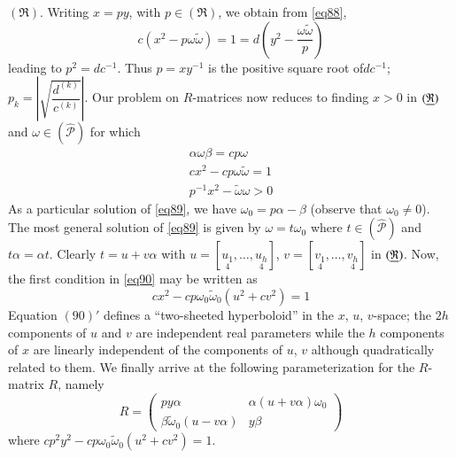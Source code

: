 $(\mathfrak{R})$. Writing $x=py$, with $p\in(\mathfrak{R})$, we obtain
from \eqref{eq88},
$$
c(x^{2}-p\omega\widetilde{\omega})=1=d\left(y^{2}-\dfrac{\omega\widetilde{\omega}}{p}\right)
$$
leading to $p^{2}=dc^{-1}$. Thus $p=xy^{-1}$ is the positive square
root of\pageoriginale $dc^{-1}$; \ie
$p_{k}=\left|\sqrt{\dfrac{d^{(k)}}{c^{(k)}}}\right|$. Our problem on
$R$-matrices now reduces to finding $x>0$ in $(\underline{\mathfrak{R}})$ and
$\omega\in(\widehat{\mathscr{P}})$ for which
\begin{gather*}
\alpha\omega\beta=cp\omega\tag{89}\label{eq89}\\
cx^{2}-cp\omega\widetilde{\omega}=1\tag{90}\label{eq90}\\
p^{-1}x^{2}-\widetilde{\omega}\omega>0
\end{gather*}
As a particular solution of \eqref{eq89}, we have
$\omega_{0}=p\alpha-\beta$ (observe that $\omega_{0}\neq 0$). The most
general solution of \eqref{eq89} is given by $\omega=t\omega_{0}$ where
$t\in(\widehat{\mathscr{P}})$ and $t\alpha=\alpha t$. Clearly
$t=u+v\alpha$ with
$u=[\underset{4}{u_{1}},\ldots,\underset{4}{u_{h}}]$,
$v=[\underset{4}{v_{1}},\ldots,\underset{4}{v_{h}}]$ in
$(\underline{\mathfrak{R}})$. Now, the first condition in \eqref{eq90} may be
written as
\begin{equation*}
cx^{2}-cp\omega_{0}\widetilde{\omega}_{0}(u^{2}+cv^{2})=1\tag*{$(90)'$}
\end{equation*}
Equation $(90)'$ defines a ``two-sheeted hyperboloid'' in the $x$,
$u$, $v$-space; the $2h$ components of $u$ and $v$ are independent
real parameters while the $h$ components of $x$ are linearly
independent of the components of $u$, $v$ although quadratically
related to them. We finally arrive at the following parameterization
for the $R$-matrix $R$, namely
\begin{equation*}
R=
\begin{pmatrix}
py\alpha & \alpha(u+v\alpha)\omega_{0}\\
\beta\widetilde{\omega}_{0}(u-v\alpha) & y\beta
\end{pmatrix}\tag{91}\label{eq91}
\end{equation*}
where
$cp^{2}y^{2}-cp\omega_{0}\widetilde{\omega}_{0}(u^{2}+cv^{2})=1$.

